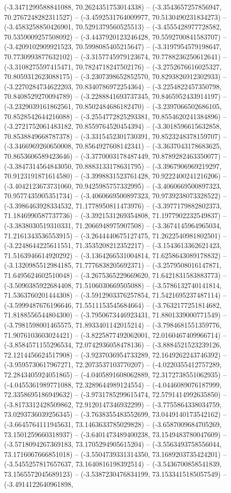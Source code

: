 (-3.3471299588841088, 70.2624351753014338) -- (-3.3543657257856947, 70.2767248282311527) -- (-3.4592531764009977, 70.5130490231834273) -- (-3.4583258850426901, 70.5291379560525513) -- (-3.4555428977728582, 70.5359009257508092) -- (-3.4437920123246428, 70.5592700841583707) -- (-3.4209102909921523, 70.5998085405215647) -- (-3.3197954579198647, 70.7730993877632102) -- (-3.3157745979123674, 70.7788236250612641) -- (-3.3108275597415471, 70.7824718247502176) -- (-3.2752676616025327, 70.8059312623088175) -- (-3.2307398652852570, 70.8293826912302933) -- (-3.2270284734622203, 70.8340786972254364) -- (-3.2254822457350798, 70.8408529270094789) -- (-3.2288841693737345, 70.8465952433914197) -- (-3.2329039161862561, 70.8502484686182470) -- (-3.2397066502686105, 70.8528542644216088) -- (-3.2554772825293381, 70.8554620241384896) -- (-3.2721752061483182, 70.8559764520454394) -- (-3.3018596615632858, 70.8538849668787378) -- (-3.3315452301730391, 70.8523248378159707) -- (-3.3466969260650008, 70.8564927608142341) -- (-3.3637043178683625, 70.8653606589423646) -- (-3.3770003178487449, 70.8789282463350077) -- (-3.3847314564843050, 70.8883133178631795) -- (-3.3967906969219297, 70.9123191871614580) -- (-3.3998831523761428, 70.9222400241216206) -- (-3.4042123673731060, 70.9425985757332995) -- (-3.4060669500897323, 70.9577435905351734) -- (-3.4060669500897323, 70.9739238073328522) -- (-3.3986463928334532, 71.1778950811473976) -- (-3.3977179882802373, 71.1846990587737736) -- (-3.3921531269354808, 71.1977902232549837) -- (-3.3838030519310331, 71.2066948975907508) -- (-3.3674145964965034, 71.2161343536553915) -- (-3.2644440675127475, 71.2622540981802501) -- (-3.2248644225611551, 71.3535208212352217) -- (-3.1543613362621423, 71.5163946614920292) -- (-3.1364266531004814, 71.6258643089178832) -- (-3.1320985512984185, 71.7776838205692371) -- (-3.2579508016147871, 71.6495624602510048) -- (-3.2675365229669620, 71.6421831583883773) -- (-3.5090385922684408, 71.5106030669505088) -- (-3.5786132740141814, 71.5363760201444308) -- (-3.5912903376257854, 71.5421695237487114) -- (-3.5999487676196646, 71.5511153545684664) -- (-3.7632177251814682, 71.8188556544804300) -- (-3.7950673446923431, 71.8801339000771549) -- (-3.7981598001465575, 71.8933401142015214) -- (-3.7984681551359776, 71.9076103603024421) -- (-3.8225877492062001, 72.0160467409966714) -- (-3.8584571155296534, 72.0742936058478136) -- (-3.8884521523239126, 72.1214456624517908) -- (-3.9237036954733289, 72.1649262243746392) -- (-3.9595730617967271, 72.2073537103770207) -- (-4.0220355412757289, 72.2843405924051865) -- (-4.0405891608062889, 72.3172738551062935) -- (-4.0455361989771088, 72.3289644989124554) -- (-4.0446089076187999, 72.3358695186949632) -- (-3.9731785299615474, 72.5791414992635850) -- (-3.8173312428509862, 72.9120147346932299) -- (-3.7755864338034759, 73.0293736039256345) -- (-3.7638355483552699, 73.0449140173542162) -- (-3.6645764111945631, 73.1463633785029828) -- (-3.6587009684705269, 73.1501259660318937) -- (-3.6401473489400238, 73.1549483780047609) -- (-3.5718094267369183, 73.1705294905615204) -- (-3.5563493758556044, 73.1716067666851018) -- (-3.5504739331314350, 73.1689203735424201) -- (-3.5455257817657637, 73.1640816198392514) -- (-3.5436700858541839, 73.1565572045689123) -- (-3.5387230476834199, 73.1533415185057549) -- (-3.4914122640961898, 